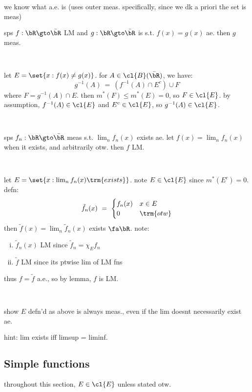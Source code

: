 we know what a.e. is (uses outer meas. specifically, since we dk
a priori the set is meas)

\begin{lm}
	sps $f:\bR\gto\bar{\bR}$ LM and $g:\bR\gto\bar{\bR}$ is s.t. $f(x)=g(x)$ ae.
	then $g$ meas.
\end{lm} \

\begin{pf}
	let $E=\set{x:f(x)\neq g(x)}$.
	for $A\in\cl{B}(\bar{\bR})$, we have:
	\begin{equation*}
		g^{-1}(A) \ = \ (f^{-1}(A)\cap E^{c}) \cup F
	\end{equation*}
	where $F=g^{-1}(A)\cap E$.
	then $m^{*}(F)\leq m^{*}(E)=0$, so $F\in\cl{E}$.
	by assumption, $f^{-1}(A)\in\cl{E}$ and $E^{c}\in\cl{E}$,
	so $g^{-1}(A)\in\cl{E}$.
\end{pf} \

\begin{crll}
	sps $f_{n}:\bR\gto\bar{\bR}$ meas s.t. $\lim_{n}f_{n}(x)$ exists ae.
	let $f(x)=\lim_{n}f_{n}(x)$ when it exists, and arbitrarily otw.
	then $f$ LM.
\end{crll} \

\begin{pf}
	let $E=\set{x:\lim_{n}f_{n}(x) \trm{ exists}}$.
	note $E\in\cl{E}$ since $m^{*}(E^{c})=0$.
	defn:
	\begin{equation*}
		\tilde{f}_{n}(x) \ = \
		\begin{cases} f_{n}(x) & x \in E \\ 0 & \trm{otw} \end{cases}
	\end{equation*}
	then $\tilde{f}(x)=\lim_{n}\tilde{f}_{n}(x)$ exists $\fa \bR$.
	note:
	\begin{enumerate}[i)]
		\item $\tilde{f}_{n}(x)$ LM since $\tilde{f}_{n}=\chi_{E}f_{n}$
		\item $\tilde{f}$ LM since its ptwise lim of LM fns
	\end{enumerate}
	thus $f=\tilde{f}$ a.e., so by lemma, $f$ is LM.
\end{pf} \

\begin{exr}
	show $E$ defn'd as above is always meas., even if the lim
	doesnt necessarily exist ae.
\end{exr}
hint: lim exists iff limsup = liminf.

\subsection{Simple functions}
throughout this section, $E\in\cl{E}$ unless stated otw.

